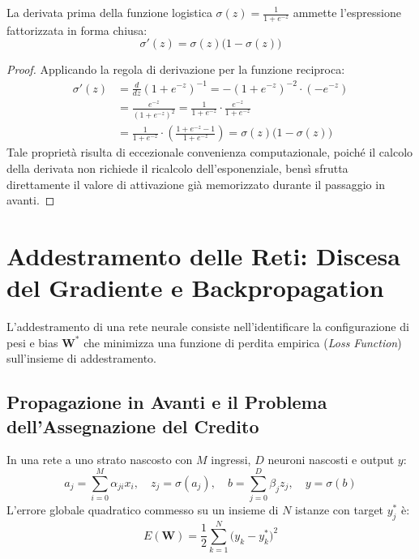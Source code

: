 \begin{theorem}
La derivata prima della funzione logistica $\sigma(z) = \frac{1}{1 + e^{-z}}$ ammette l'espressione fattorizzata in forma chiusa:
\begin{equation}
    \sigma'(z) = \sigma(z)\big(1 - \sigma(z)\big)
\end{equation}
\end{theorem}
\begin{proof}
Applicando la regola di derivazione per la funzione reciproca:
\begin{align}
    \sigma'(z) &= \frac{d}{dz} (1 + e^{-z})^{-1} = - (1 + e^{-z})^{-2} \cdot (-e^{-z}) \nonumber \\
    &= \frac{e^{-z}}{(1 + e^{-z})^2} = \frac{1}{1 + e^{-z}} \cdot \frac{e^{-z}}{1 + e^{-z}} \nonumber \\
    &= \frac{1}{1 + e^{-z}} \cdot \left( \frac{1 + e^{-z} - 1}{1 + e^{-z}} \right) = \sigma(z) \big(1 - \sigma(z)\big)
\end{align}
Tale proprietà risulta di eccezionale convenienza computazionale, poiché il calcolo della derivata non richiede il ricalcolo dell'esponenziale, bensì sfrutta direttamente il valore di attivazione già memorizzato durante il passaggio in avanti.
\end{proof}

\FloatBarrier
\section{Addestramento delle Reti: Discesa del Gradiente e Backpropagation}
\label{sec:dm-backpropagation-theory}

L'addestramento di una rete neurale consiste nell'identificare la configurazione di pesi e bias $\mathbf{W}^*$ che minimizza una funzione di perdita empirica (\textit{Loss Function}) sull'insieme di addestramento.

\FloatBarrier
\subsection{Propagazione in Avanti e il Problema dell'Assegnazione del Credito}
\label{subsec:dm-forward-credit-assignment}

In una rete a uno strato nascosto con $M$ ingressi, $D$ neuroni nascosti e output $y$:
\begin{equation}
    a_j = \sum_{i=0}^M \alpha_{ji} x_i, \quad z_j = \sigma(a_j), \quad b = \sum_{j=0}^D \beta_j z_j, \quad y = \sigma(b)
\end{equation}
L'errore globale quadratico commesso su un insieme di $N$ istanze con target $y_j^*$ è:
\begin{equation}
    E(\mathbf{W}) = \frac{1}{2} \sum_{k=1}^N \big(y_k - y_k^*\big)^2
\end{equation}

